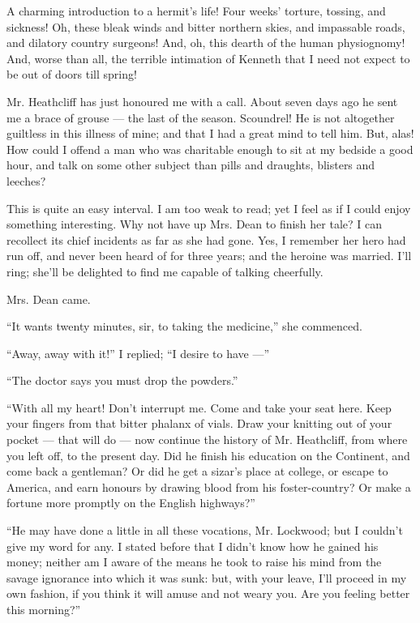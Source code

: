 \par A charming introduction to a hermit's life! Four weeks' torture, tossing, and sickness! Oh, these bleak winds and bitter northern skies, and impassable roads, and dilatory country surgeons! And, oh, this dearth of the human physiognomy! And, worse than all, the terrible intimation of Kenneth that I need not expect to be out of doors till spring!
\par Mr. Heathcliff has just honoured me with a call. About seven days ago he sent me a brace of grouse — the last of the season. Scoundrel! He is not altogether guiltless in this illness of mine; and that I had a great mind to tell him. But, alas! How could I offend a man who was charitable enough to sit at my bedside a good hour, and talk on some other subject than pills and draughts, blisters and leeches?
\par This is quite an easy interval. I am too weak to read; yet I feel as if I could enjoy something interesting. Why not have up Mrs. Dean to finish her tale? I can recollect its chief incidents as far as she had gone. Yes, I remember her hero had run off, and never been heard of for three years; and the heroine was married. I'll ring; she'll be delighted to find me capable of talking cheerfully.
\par Mrs. Dean came.
\par “It wants twenty minutes, sir, to taking the medicine,” she commenced.
\par “Away, away with it!” I replied; “I desire to have —”
\par “The doctor says you must drop the powders.”
\par “With all my heart! Don't interrupt me. Come and take your seat here. Keep your fingers from that bitter phalanx of vials. Draw your knitting out of your pocket — that will do — now continue the history of Mr. Heathcliff, from where you left off, to the present day. Did he finish his education on the Continent, and come back a gentleman? Or did he get a sizar's place at college, or escape to America, and earn honours by drawing blood from his foster-country? Or make a fortune more promptly on the English highways?”
\par “He may have done a little in all these vocations, Mr. Lockwood; but I couldn't give my word for any. I stated before that I didn't know how he gained his money; neither am I aware of the means he took to raise his mind from the savage ignorance into which it was sunk: but, with your leave, I'll proceed in my own fashion, if you think it will amuse and not weary you. Are you feeling better this morning?”
